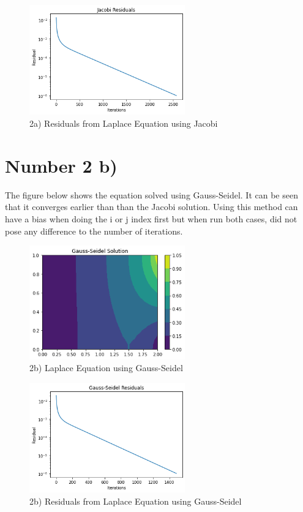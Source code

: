 \documentclass{article}
\begin{document}
		\begin{figure}[H]
			\centering
			\includegraphics[width=0.6\textwidth]{images/jacores.png}
			\caption{\label{} 2a) Residuals from Laplace Equation using Jacobi }
		\end{figure}
	
	\section*{Number 2 b)}
		The figure below shows the equation solved using Gauss-Seidel. It can be seen that it converges earlier than than the Jacobi solution. Using this method can have a bias when doing the i or j index first but when run both cases, did not pose any difference to the number of iterations.
		
		\begin{figure}[H]
			\centering
			\includegraphics[width=0.6\textwidth]{images/gase.png}
			\caption{\label{} 2b) Laplace Equation using Gauss-Seidel }
		\end{figure}
		
		\begin{figure}[H]
			\centering
			\includegraphics[width=0.6\textwidth]{images/gaseres.png}
			\caption{\label{} 2b) Residuals from Laplace Equation using Gauss-Seidel }
		\end{figure}
	
\end{document}
